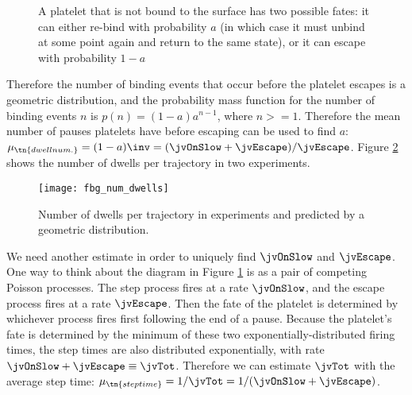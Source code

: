 \begin{figure}
  \centering
  \caption[Possible fates of an unbound platelet]{A platelet that is
    not bound to the surface has two possible fates: it can either
    re-bind with probability $a$ (in which case it must unbind at some
    point again and return to the same state), or it can escape with
    probability $1 - a$}
  \label{fig:unbd-plt-fates}
\end{figure}

Therefore the number of binding events that occur before the platelet
escapes is a geometric distribution, and the probability mass function
for the number of binding events $n$ is $p(n) = (1 - a) a^{n - 1}$,
where $n >= 1$. Therefore the mean number of pauses platelets have
before escaping can be used to find $a$:
$\mu_\tn{dwell num.}  = (1 - a)\inv = (\jvOnSlow + \jvEscape) /
\jvEscape$. Figure \ref{fig:ndwells} shows the number of dwells per
trajectory in two experiments.

\begin{figure}
  \centering
  \texttt{[image: fbg\_num\_dwells]}
  \caption{Number of dwells per trajectory in experiments and
    predicted by a geometric distribution.}
  \label{fig:ndwells}
\end{figure}

We need another estimate in order to uniquely find $\jvOnSlow$ and
$\jvEscape$. One way to think about the diagram in Figure
\ref{fig:unbd-plt-fates} is as a pair of competing Poisson
processes. The step process fires at a rate $\jvOnSlow$, and the
escape process fires at a rate $\jvEscape$. Then the fate of the
platelet is determined by whichever process fires first following the
end of a pause. Because the platelet's fate is determined by the
minimum of these two exponentially-distributed firing times, the step
times are also distributed exponentially, with rate
$\jvOnSlow + \jvEscape \equiv \jvTot$. Therefore we can estimate
$\jvTot$ with the average step time:
$\mu_\tn{step time} = 1/\jvTot = 1/(\jvOnSlow + \jvEscape)$.


